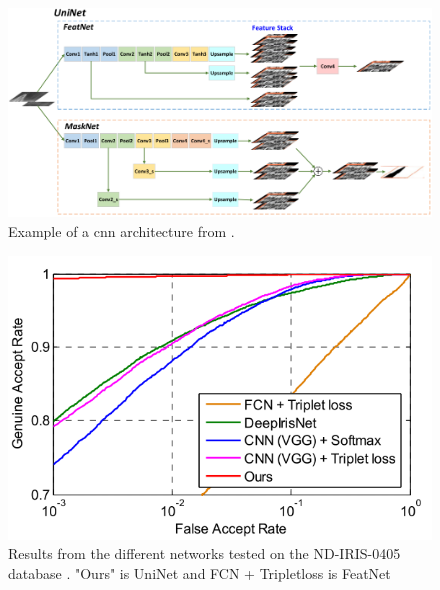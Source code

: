 \begin{figure}[H]
\centering
\includegraphics[width=\textwidth]{figures/Zhao2017_CNN_model} 
\caption{Example of a \gls{cnn} architecture  from \cite{Zhao2017}.}
\label{fig:Zhao2017_CNN_model}
\end{figure}

\begin{figure}[H]
\centering
\includegraphics[width=\textwidth]{figures/Zhao2017_CNN_results} 
\caption{Results from the different networks tested on the ND-IRIS-0405 database  \cite{Zhao2017}. "Ours" is UniNet and FCN + Tripletloss is FeatNet}
\label{fig:Zhao2017_CNN_results}
\end{figure}


